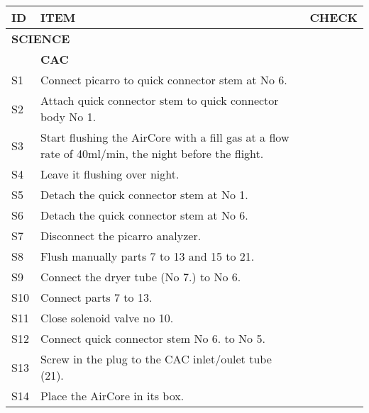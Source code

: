 


\begin{longtable} {|m{}|m{}|m{}|}
\hline
\textbf{ID} & \textbf{ITEM} & \textbf{CHECK} \\
\hline
\multicolumn{2}{|l|}{ \textbf{SCIENCE} } & \\
\hline
& \textbf{CAC} & \\
\hline
S1 & Connect picarro to quick connector stem at No 6. & \\ \hline
S2 & Attach quick connector stem to quick connector body No 1. & \\ \hline
S3 & Start flushing the AirCore with a fill gas at a flow rate of 40ml/min, the night before the flight. & \\ \hline
S4 & Leave it flushing over night. & \\ \hline
S5 & Detach the quick connector stem at No 1. & \\ \hline
S6 & Detach the quick connector stem at No 6. & \\ \hline
S7 & Disconnect the picarro analyzer. & \\ \hline
S8 & Flush manually parts 7 to 13 and 15 to 21. & \\ \hline
S9 & Connect the dryer tube (No 7.) to No 6. & \\ \hline
S10 & Connect parts 7 to 13. & \\ \hline
S11 & Close solenoid valve no 10. & \\ \hline
S12 & Connect quick connector stem No 6. to No 5. & \\ \hline
S13 & Screw in the plug to the CAC inlet/oulet tube (21). & \\ \hline
S14 & Place the AirCore in its box. & \\ \hline


\end{longtable}
